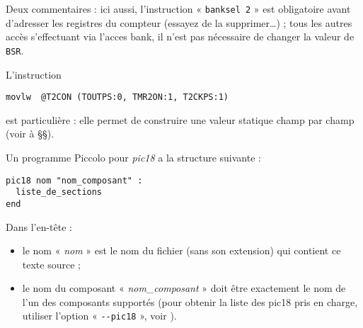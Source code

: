 Deux commentaires : ici aussi, l’instruction « \texttt{banksel 2} » est obligatoire avant d’adresser les registres du compteur (essayez de la supprimer…) ; tous les autres accès s’effectuant via l’acces bank, il n’est pas nécessaire de changer la valeur de \texttt{BSR}.

L’instruction
\begin{lstlisting}[language=piccolo]
  movlw  @T2CON (TOUTPS:0, TMR2ON:1, T2CKPS:1)
\end{lstlisting}
est particulière : elle permet de construire une valeur statique champ par champ (voir à §§).








Un programme Piccolo pour \emph{pic18} a la structure suivante :

\begin{lstlisting}[language=piccolo]
pic18 nom "nom_composant" :
  liste_de_sections
end
\end{lstlisting}


Dans l’en-tête :
\begin{itemize}
  \item le nom « \emph{nom} » est le nom du fichier (sans son extension) qui contient ce texte source ;
  \item le nom du composant « \emph{nom\_composant} » doit être exactement le nom de l’un des composants supportés (pour obtenir la liste des pic18 pris en charge, utiliser l’option « \texttt{-{}-pic18} », voir ).
\end{itemize}


